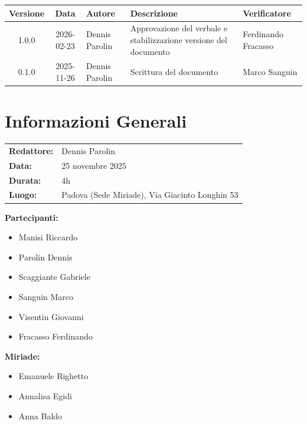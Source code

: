\documentclass[a4paper,12pt]{article}
\begin{document}
\begin{center}
\small
\renewcommand{\arraystretch}{1.2} 
\begin{tabularx}{\textwidth}{|c|c|>{\raggedright\arraybackslash}p{}|>{\raggedright\arraybackslash}X|>{\raggedright\arraybackslash}p{}|}
\hline
\rowcolor{gray!60} 
\textbf{Versione} & \textbf{Data} & \textbf{Autore} & \textbf{Descrizione} & \textbf{Verificatore} \\
\hline

\rowcolor{white}
1.0.0 & 2026-02-23 & Dennis Parolin & Approvazione del verbale e stabilizzazione versione del documento & Ferdinando Fracasso \\
\hline
\rowcolor{gray!20}
0.1.0 & 2025-11-26 & Dennis Parolin & Scrittura del documento & Marco Sanguin \\
\hline
\end{tabularx}
\end{center}

\section*{Informazioni Generali}
\renewcommand{\arraystretch}{1.3}

\begin{tcolorbox}
\begin{tabularx}{\textwidth}{@{}l X@{}}
\textbf{Redattore:} & Dennis Parolin \\
\textbf{Data:} & 25 novembre 2025 \\
\textbf{Durata:} & 4h \\
\textbf{Luogo:} & Padova (Sede Miriade), Via Giacinto Longhin 53 \\
\end{tabularx}
\end{tcolorbox}

\vspace{0.4cm}
\textbf{Partecipanti:}
\begin{itemize}
    \item Manisi Riccardo
    \item Parolin Dennis
    \item Scaggiante Gabriele
    \item Sanguin Marco
    \item Visentin Giovanni
	\item Fracasso Ferdinando
\end{itemize}

\textbf{Miriade:}
\begin{itemize}
    \item Emanuele Righetto
    \item Annalisa Egidi
    \item Anna Baldo
\end{itemize}
\end{document}
